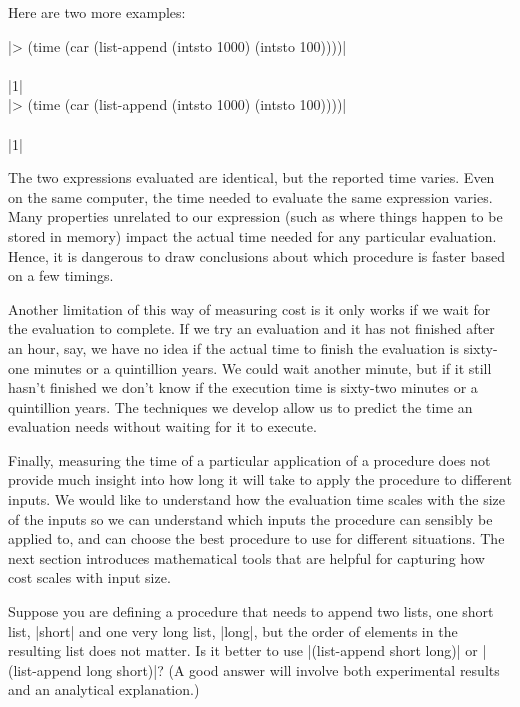 \begin{schemeregion}
Here are two more examples:
\begin{code}
\scheme|> (time (car (list-append (intsto 1000) (intsto 100))))|\\
\\
\schemeresult|1|\\
\scheme|> (time (car (list-append (intsto 1000) (intsto 100))))|\\
\\
\schemeresult|1|
\end{code}

The two expressions evaluated are identical, but the reported time varies.  Even on the same computer, the time needed to evaluate the same expression varies.  Many properties unrelated to our expression (such as where things happen to be stored in memory) impact the actual time needed for any particular evaluation.  Hence, it is dangerous to draw conclusions about which procedure is faster based on a few timings.  

Another limitation of this way of measuring cost is it only works if we wait for the evaluation to complete.  If we try an evaluation and it has not finished after an hour, say, we have no idea if the actual time to finish the evaluation is sixty-one minutes or a quintillion years.  We could wait another minute, but if it still hasn't finished we don't know if the execution time is sixty-two minutes or a quintillion years.  The techniques we develop allow us to predict the time an evaluation needs without waiting for it to execute.

Finally, measuring the time of a particular application of a procedure does not provide much insight into how long it will take to apply the procedure to different inputs.  We would like to understand how the evaluation time scales with the size of the inputs so we can understand which inputs the procedure can sensibly be applied to, and can choose the best procedure to use for different situations.  The next section introduces mathematical tools that are helpful for capturing how cost scales with input size.

\beforesplitex
\begin{exercise}
Suppose you are defining a procedure that needs to append two lists, one short list, \scheme|short| and one very long list, \scheme|long|, but the order of elements in the resulting list does not matter.  Is it better to use \scheme|(list-append short long)| or \scheme|(list-append long short)|? (A good answer will involve both experimental results and an analytical explanation.)
\end{exercise}
\end{schemeregion}
